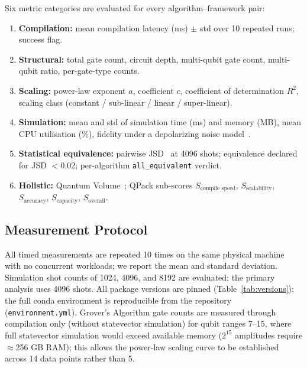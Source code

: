 Six metric categories are evaluated for every algorithm--framework pair:
\begin{enumerate}
  \item \textbf{Compilation:} mean compilation latency (ms) $\pm$ std
        over 10 repeated runs; success flag.
  \item \textbf{Structural:} total gate count, circuit depth, multi-qubit
        gate count, multi-qubit ratio, per-gate-type counts.
  \item \textbf{Scaling:} power-law exponent $a$, coefficient $c$,
        coefficient of determination $R^2$, scaling class
        (constant / sub-linear / linear / super-linear).
  \item \textbf{Simulation:} mean and std of simulation time (ms) and
        memory (MB), mean CPU utilisation (\%), fidelity under a
        depolarizing noise model~\cite{nielsen2010quantum}.
  \item \textbf{Statistical equivalence:} pairwise
        JSD~\cite{lin1991divergence} at 4096 shots; equivalence declared
        for JSD $< 0.02$; per-algorithm \texttt{all\_equivalent} verdict.
  \item \textbf{Holistic:} Quantum Volume~\cite{cross2019validating};
        QPack sub-scores $S_{\text{compile\_speed}}$,
        $S_{\text{scalability}}$, $S_{\text{accuracy}}$,
        $S_{\text{capacity}}$, $S_{\text{overall}}$.
\end{enumerate}

\subsection{Measurement Protocol}

All timed measurements are repeated 10 times on the same physical
machine with no concurrent workloads; we report the mean and standard
deviation.
Simulation shot counts of 1024, 4096, and 8192 are evaluated; the
primary analysis uses 4096 shots.
All package versions are pinned (Table~\ref{tab:versions}); the full
conda environment is reproducible from the repository
(\texttt{environment.yml}).
Grover's Algorithm gate counts are measured through compilation only
(without statevector simulation) for qubit ranges 7--15, where full
statevector simulation would exceed available memory ($2^{15}$ amplitudes
require $\approx$256 GB RAM); this allows the power-law scaling curve
to be established across 14 data points rather than 5.
